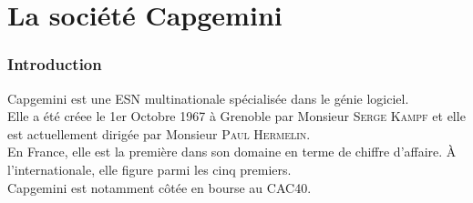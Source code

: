 \chapter{La société Capgemini}
\subsection*{Introduction}
Capgemini est une ESN multinationale spécialisée dans le génie logiciel.
\\Elle a été créee le 1er Octobre 1967 à Grenoble par Monsieur \textsc{Serge Kampf} et elle est actuellement dirigée par  Monsieur \textsc{Paul Hermelin}.\\
En France, elle est la première dans son domaine en terme de chiffre d'affaire. \`A l'internationale, elle figure parmi les cinq premiers.
\\Capgemini est notamment côtée en bourse au CAC40.
\\\\
\begin{figure}[h]
\end{figure}

\newpage
